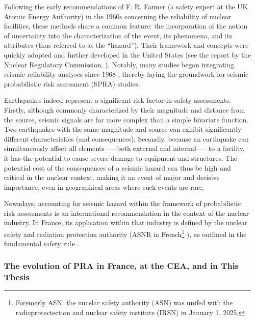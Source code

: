 Following the early recommendations of F. R. Farmer (a safety expert at the UK Atomic Energy Authority) in the 1960s concerning the reliability of nuclear facilities, these methods share a common feature: the incorporation of the notion of uncertainty into the characterization of the event, its phenomena, and its attributes (thus referred to as the ``hazard''). Their framework and concepts were quickly adopted and further developed in the United States (see the report by the Nuclear Regulatory Commission, \cite{nrc_pra_1983}). Notably, many studies began integrating seismic reliability analyses since 1968 \citep{cornell_engineering_1968}, thereby laying the groundwork for seismic probabilistic risk assessment (SPRA) studies.



Earthquakes indeed represent a significant risk factor in safety assessments. Firstly, although commonly characterized by their magnitude and distance from the source, seismic signals are far more complex than a simple bivariate function. Two earthquakes with the same magnitude and source can exhibit significantly different characteristics (and consequences). Secondly, because an earthquake can simultaneously affect all elements —--both external and internal—-- to a facility, it has the potential to cause severe damage to equipment and structures. The potential cost of the consequences of a seismic hazard can thus be high and critical in the nuclear context, making it an event of major and decisive importance, even in geographical areas where such events are rare.


Nowadays, accounting for seismic hazard within the framework of probabilistic risk assessments is an international recommendation in the context of the nuclear industry. In France, its application within that industry is defined by the nuclear safety and radiation protection authority (ASNR in French\footnote{Foremerly ASN: the nucelar safety authority (ASN) was unifed with the radioprotectection and nuclear safety institute (IRSN) in January 1, 2025.} ), as outlined in the fundamental safety rule \citep{asn_regle_2002}.



\subsubsection{The evolution of PRA in France, at the CEA, and in This Thesis}

